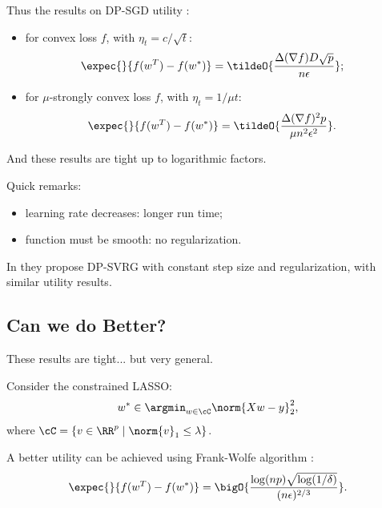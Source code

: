 \documentclass[notheorems]{beamer}
\begin{document}
\begin{frame}
  Thus the results on DP-SGD utility :
  \begin{itemize}
  \item for convex loss $f$, with $\eta_t = c / \sqrt{t}$:
    \begin{align*}
      \expec{}{f(w^T) - f(w^*)}
      & = \tildeO{\frac{\Delta(\nabla f) D \sqrt{p}}{n\epsilon}};
    \end{align*}
  \item for $\mu$-strongly convex loss $f$, with $\eta_t = 1/\mu t$:
    \begin{align*}
      \expec{}{f(w^T) - f(w^*)}
      & = \tildeO{\frac{\Delta(\nabla f)^2 p}{\mu n^2\epsilon^2}}.
    \end{align*}
  \end{itemize}

  And these results are {\color{purple} tight up to logarithmic factors}.
\end{frame}


\begin{frame}
  Quick remarks:
  \begin{itemize}
  \item learning rate decreases: longer run time;
  \item function must be smooth: no regularization.
  \end{itemize}

  \vspace{1em}

  In  they propose DP-SVRG with constant step size and regularization, with similar utility results.
\end{frame}

\subsection{Can we do Better?}
\label{sub:can_we_do_better_}

\begin{frame}
  These results are tight... but very general.

  \vspace{1em}

  Consider the constrained LASSO:
  \begin{align*}
    w^* \in \argmin_{w \in \cC} \norm{Xw - y}_2^2,
  \end{align*}
  where $\cC = \{v \in \RR^p \mid \norm{v}_1 \le \lambda\}$.

  A better utility can be achieved using Frank-Wolfe algorithm :
  \begin{align*}
    \expec{}{f(w^T) - f(w^*)} = \bigO{\frac{\log(np) \sqrt{\log(1/\delta)}}{(n\epsilon)^{2/3}}}.
  \end{align*}
\end{frame}
\end{document}
